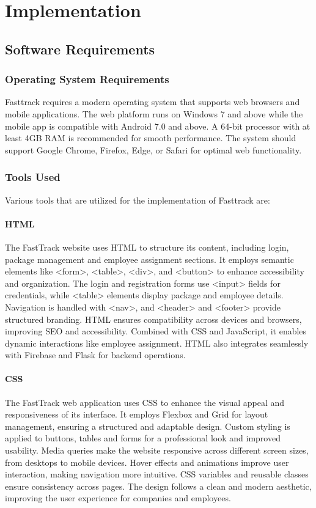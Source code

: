 \chapter{Implementation}
\label{Implementation}


\section{Software Requirements}
\subsection{Operating System Requirements}
Fasttrack requires a modern operating system that supports web browsers and mobile applications. The web platform runs on Windows 7 and above while the mobile app is compatible with Android 7.0 and above. A 64-bit processor with at least 4GB RAM is recommended for smooth performance. The system should support Google Chrome, Firefox, Edge, or Safari for optimal web functionality. 
\subsection{Tools Used}
Various tools that are utilized for the implementation of Fasttrack are:
\subsubsection{HTML}
The FastTrack website uses HTML to structure its content, including login, package management and employee assignment sections. It employs semantic elements like <form>, <table>, <div>, and <button> to enhance accessibility and organization. The login and registration forms use <input> fields for credentials, while <table> elements display package and employee details. Navigation is handled with <nav>, and <header> and <footer> provide structured branding. HTML ensures compatibility across devices and browsers, improving SEO and accessibility. Combined with CSS and JavaScript, it enables dynamic interactions like employee assignment. HTML also integrates seamlessly with Firebase and Flask for backend operations.
\subsubsection{CSS}
The FastTrack web application uses CSS to enhance the visual appeal and responsiveness of its interface. It employs Flexbox and Grid for layout management, ensuring a structured and adaptable design. Custom styling is applied to buttons, tables and forms for a professional look and improved usability. Media queries make the website responsive across different screen sizes, from desktops to mobile devices. Hover effects and animations improve user interaction, making navigation more intuitive. CSS variables and reusable classes ensure consistency across pages. The design follows a clean and modern aesthetic, improving the user experience for companies and employees.
